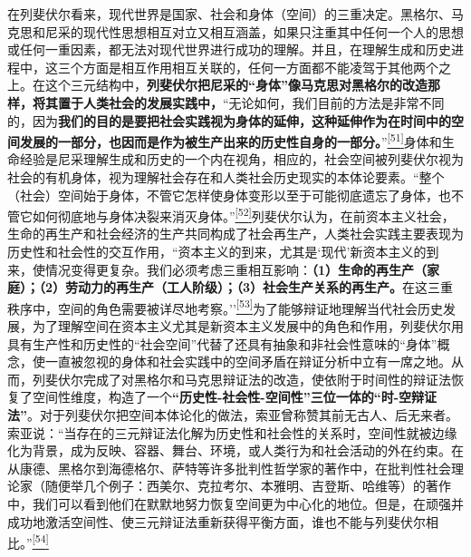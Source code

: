 \documentclass[UTF8, fontset = sourcesans, a4paper, oneside, zihao =
-4, scheme=chinese, no-math, space=true]{ctexbook}
\begin{document}
在列斐伏尔看来，现代世界是国家、社会和身体（空间）的三重决定。黑格尔、马克思和尼采的现代性思想相互对立又相互涵盖，如果只注重其中任何一个人的思想或任何一重因素，都无法对现代世界进行成功的理解。并且，在理解生成和历史进程中，这三个方面是相互作用相互关联的，任何一方面都不能凌驾于其他两个之上。在这个三元结构中，\textbf{列斐伏尔把尼采的``身体''像马克思对黑格尔的改造那样，将其置于人类社会的发展实践中，}``无论如何，我们目前的方法是非常不同的，因为\textbf{我们的目的是要把社会实践视为身体的延伸，这种延伸作为在时间中的空间发展的一部分，也因而是作为被生产出来的历史性自身的一部分。}''\protect\hypertarget{part0005_split_003.htmlux5cux23w51}{}{}\protect\hyperlink{part0005_split_003.htmlux5cux23m51}{\textsuperscript{{[}51{]}}}身体和生命经验是尼采理解生成和历史的一个内在视角，相应的，社会空间被列斐伏尔视为社会的有机身体，视为理解社会存在和人类社会历史现实的本体论要素。``整个（社会）空间始于身体，不管它怎样使身体变形以至于可能彻底遗忘了身体，也不管它如何彻底地与身体决裂来消灭身体。''\protect\hypertarget{part0005_split_003.htmlux5cux23w52}{}{}\protect\hyperlink{part0005_split_003.htmlux5cux23m52}{\textsuperscript{{[}52{]}}}列斐伏尔认为，在前资本主义社会，生命的再生产和社会经济的生产共同构成了社会再生产，人类社会实践主要表现为历史性和社会性的交互作用，``资本主义的到来，尤其是`现代'新资本主义的到来，使情况变得更复杂。我们必须考虑三重相互影响：\textbf{（1）生命的再生产（家庭）；（2）劳动力的再生产（工人阶级）；（3）社会生产关系的再生产。}在这三重秩序中，空间的角色需要被详尽地考察。''\protect\hypertarget{part0005_split_003.htmlux5cux23w53}{}{}\protect\hyperlink{part0005_split_003.htmlux5cux23m53}{\textsuperscript{{[}53{]}}}为了能够辩证地理解当代社会历史发展，为了理解空间在资本主义尤其是新资本主义发展中的角色和作用，列斐伏尔用具有生产性和历史性的``社会空间''代替了还具有抽象和非社会性意味的``身体''概念，使一直被忽视的身体和社会实践中的空间矛盾在辩证分析中立有一席之地。从而，列斐伏尔完成了对黑格尔和马克思辩证法的改造，使依附于时间性的辩证法恢复了空间性维度，构造了一个\textbf{``历史性-社会性-空间性''三位一体的``时-空辩证法''}。对于列斐伏尔把空间本体论化的做法，索亚曾称赞其前无古人、后无来者。索亚说：``当存在的三元辩证法化解为历史性和社会性的关系时，空间性就被边缘化为背景，成为反映、容器、舞台、环境，或人类行为和社会活动的外在约束。在从康德、黑格尔到海德格尔、萨特等许多批判性哲学家的著作中，在批判性社会理论家（随便举几个例子：西美尔、克拉考尔、本雅明、吉登斯、哈维等）的著作中，我们可以看到他们在默默地努力恢复空间更为中心化的地位。但是，在顽强并成功地激活空间性、使三元辩证法重新获得平衡方面，谁也不能与列斐伏尔相比。''\protect\hypertarget{part0005_split_003.htmlux5cux23w54}{}{}\protect\hyperlink{part0005_split_003.htmlux5cux23m54}{\textsuperscript{{[}54{]}}}
\end{document}
